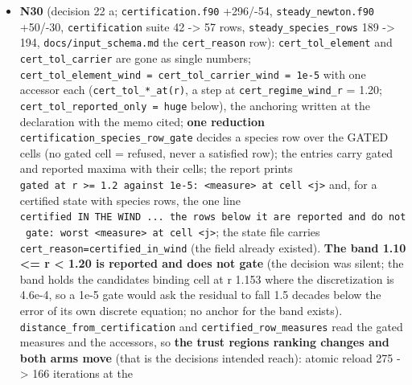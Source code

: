 \documentclass[english,a4paper]{my_memo}
\begin{document}
\begin{itemize}
  measure column 57 percent at one row; \texttt{log10\ Mdot} 7.29). The failing case
  was identified by its own section of the log (the advisor\textquotesingle s first parse
  attributed the summary line to \texttt{hp\_front}, which PASSES). Refreshed:
  \texttt{golden/lower\_profile} archived as \texttt{golden\_pre\_n29\_20260910/lower\_profile},
  \texttt{run\_check.sh\ golden\ lower\_profile} snapshotted the gate\textquotesingle s output, the
  four files compared identical to the case output with the comparator\textquotesingle s
  filter. No other golden touched.
\item
  \textbf{N30} (decision 22 a; \texttt{certification.f90} +296/-54, \texttt{steady\_newton.f90}
  +50/-30, \texttt{certification} suite 42 -\textgreater{} 57 rows, \texttt{steady\_species\_rows} 189 -\textgreater{}
  194, \texttt{docs/input\_schema.md} the \texttt{cert\_reason} row): \texttt{cert\_tol\_element} and
  \texttt{cert\_tol\_carrier} are gone as single numbers; \texttt{cert\_tol\_element\_wind\ =\ cert\_tol\_carrier\_wind\ =\ 1e-5} with one accessor each (\texttt{cert\_tol\_*\_at(r)}, a
  step at \texttt{cert\_regime\_wind\_r} = 1.20; \texttt{cert\_tol\_reported\_only\ =\ huge} below),
  the anchoring written at the declaration with the memo cited; \textbf{one
  reduction} \texttt{certification\_species\_row\_gate} decides a species row over
  the GATED cells (no gated cell = refused, never a satisfied row); the
  entries carry gated and reported maxima with their cells; the report
  prints \texttt{gated\ at\ r\ \textgreater{}=\ 1.2\ against\ 1e-5:\ \textless{}measure\textgreater{}\ at\ cell\ \textless{}j\textgreater{}} and, for a
  certified state with species rows, the one line \texttt{certified\ IN\ THE\ WIND\ ...\ the\ rows\ below\ it\ are\ reported\ and\ do\ not\ gate:\ worst\ \textless{}measure\textgreater{}\ at\ cell\ \textless{}j\textgreater{}}; the state file carries \texttt{cert\_reason=certified\_in\_wind} (the field
  already existed). \textbf{The band 1.10 \textless= r \textless{} 1.20 is reported and does not
  gate} (the decision was silent; the band holds the candidates\textquotesingle{} binding
  cell at r 1.153 where the discretization is 4.6e-4, so a 1e-5 gate would
  ask the residual to fall 1.5 decades below the error of its own discrete
  equation; no anchor for the band exists). \texttt{distance\_from\_certification}
  and \texttt{certified\_row\_measures} read the gated measures and the accessors, so
  \textbf{the trust region\textquotesingle s ranking changes and both arms move} (that is the
  decision\textquotesingle s intended reach): atomic reload 275 -\textgreater{} 166 iterations at the

\end{itemize}
\end{document}
